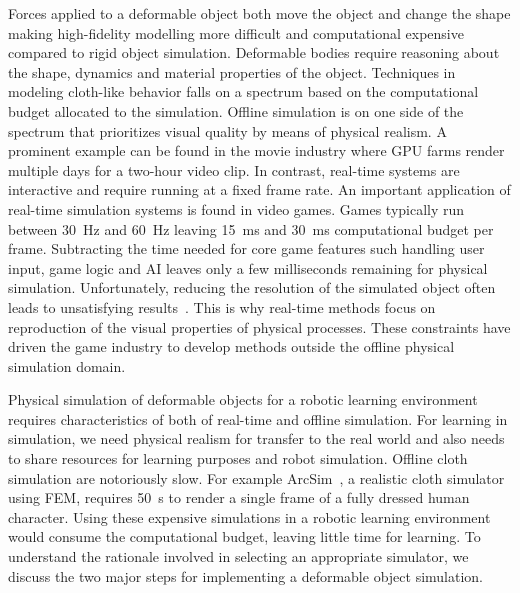 \documentclass[\home/main.tex]{subfiles}
\begin{document}
Forces applied to a deformable object both move the object and change the shape making high-fidelity modelling more difficult and computational expensive compared to rigid object simulation. Deformable bodies require reasoning about the shape, dynamics and material properties of the object. Techniques in modeling cloth-like behavior falls on a spectrum based on the computational budget allocated to the simulation. Offline simulation is on one side of the spectrum that prioritizes visual quality by means of physical realism. A prominent example can be found in the movie industry where \gls{GPU} farms render multiple days for a two-hour video clip. In contrast, real-time systems are interactive and require running at a fixed frame rate. An important application of real-time simulation systems is found in video games. Games typically run between \SI{30}{\hertz} and \SI{60}{\hertz} leaving \SI{15}{\milli\second} and \SI{30}{\milli\second} computational budget per frame. Subtracting the time needed for core game features such handling user input, game logic and \gls{AI} leaves only a few milliseconds remaining for physical simulation. Unfortunately, reducing the resolution of the simulated object often leads to unsatisfying results~\autocite{NVidia flex kerel Muller}. This is why real-time methods focus on reproduction of the visual properties of physical processes. These constraints have driven the game industry to develop methods outside the offline physical simulation domain.

Physical simulation of deformable objects for a robotic learning environment requires characteristics of both of real-time and offline simulation. For learning in simulation, we need physical realism for transfer to the real world and also needs to share resources for learning purposes and robot simulation. Offline cloth simulation are notoriously slow. For example ArcSim~\autocite{narain2012adaptive}, a realistic cloth simulator using \gls{FEM}, requires \SI{50}{\second} to render a single frame of a fully dressed human character. Using these expensive simulations in a robotic learning environment would consume the computational budget, leaving little time for learning. To understand the rationale involved in selecting an appropriate simulator, we discuss the two major steps for implementing a deformable object simulation.
\end{document}
